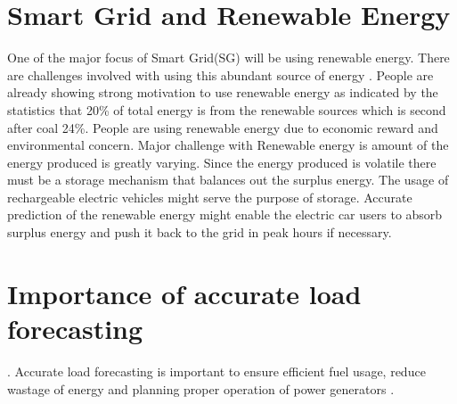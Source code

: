 \section{Smart Grid and Renewable Energy}
One of the major focus of Smart Grid(SG) will be using renewable energy. There are challenges involved with using this abundant source of energy \cite{richter2012transitioning}. People are already showing strong motivation to use renewable energy as indicated by the statistics that 20\% of total energy is from the renewable sources which is second after coal 24\%. People are using renewable energy due to economic reward and environmental concern. Major challenge with Renewable energy is amount of the energy produced is greatly varying. Since the energy produced is volatile there must be a storage mechanism that balances out the surplus energy. The usage of rechargeable electric vehicles might serve the purpose of storage. Accurate prediction of the renewable energy might enable the electric car users to absorb surplus energy and push it back to the grid in peak hours if necessary. 




\section{Importance of accurate load forecasting}.
Accurate load forecasting is important to ensure efficient fuel usage, reduce wastage of energy and planning proper operation of power generators \cite{liu2006accurate}.






